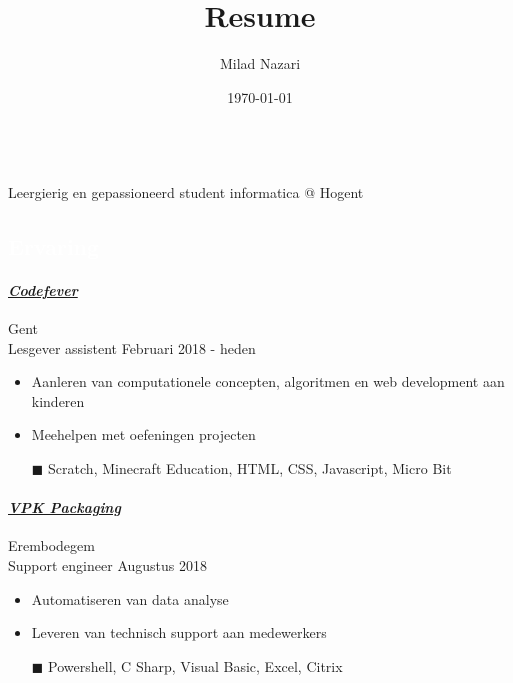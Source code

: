 \documentclass[a4paper, twoside]{article}
\title{Resume}
\author{ Milad Nazari }
\date{\today}
\begin{document}
\begin{multicols}{2}
\\
\noindent Leergierig en gepassioneerd student informatica @ Hogent
\paragraph{}
\hfill{}\par
\hfill{}\par
\hfill{}\par
\end{multicols}
\begin{mdframed}
\section*{\textcolor{white}{ Ervaring }}
\end{mdframed}
\paragraph{\textbf{\textit{\href{https://codefever.be }{\textcolor{blueDark}{ Codefever }}}}} \hfill\small Gent \\
Lesgever assistent \hfill\small
Februari 2018
- heden
\begin{itemize}
\itemsep-0.2em
\item Aanleren van computationele concepten, algoritmen en web development aan kinderen
\item Meehelpen met oefeningen projecten
\item[\color{orange}$\blacksquare$] Scratch, Minecraft Education, HTML, CSS, Javascript, Micro Bit
\end{itemize}
\paragraph{\textbf{\textit{\href{https://vpkgroup.com }{\textcolor{blueDark}{ VPK Packaging }}}}} \hfill\small Erembodegem \\
Support engineer \hfill\small
Augustus 2018
\begin{itemize}
\itemsep-0.2em
\item Automatiseren van data analyse
\item Leveren van technisch support aan medewerkers
\item[\color{orange}$\blacksquare$] Powershell, C Sharp, Visual Basic, Excel, Citrix
\end{itemize}
\end{document}

